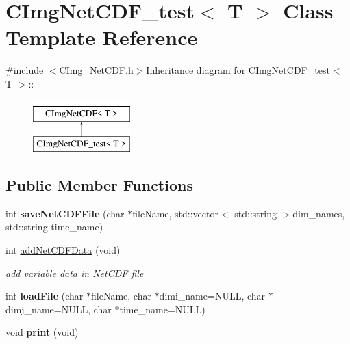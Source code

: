 \hypertarget{classCImgNetCDF__test}{
\section{CImgNetCDF\_\-test$<$ T $>$ Class Template Reference}
\label{classCImgNetCDF__test}
}


{\ttfamily \#include $<$CImg\_\-NetCDF.h$>$}Inheritance diagram for CImgNetCDF\_\-test$<$ T $>$::\begin{figure}[H]
\begin{center}
\leavevmode
\includegraphics[height=2cm]{classCImgNetCDF__test}
\end{center}
\end{figure}
\subsection*{Public Member Functions}
\begin{DoxyCompactItemize}
\item 
\hypertarget{classCImgNetCDF__test_a8700c63eb0460ff2335a99d85420d579}{
int {\bfseries saveNetCDFFile} (char $\ast$fileName, std::vector$<$ std::string $>$dim\_\-names, std::string time\_\-name)}
\label{classCImgNetCDF__test_a8700c63eb0460ff2335a99d85420d579}

\item 
int \hyperlink{classCImgNetCDF__test_aae308b73b10ea3a900000888c571754c}{addNetCDFData} (void)
\begin{DoxyCompactList}\small\item\em add variable data in NetCDF file \item\end{DoxyCompactList}\item 
\hypertarget{classCImgNetCDF__test_ac942fc1b5c2231ebedcc659bacfabe3b}{
int {\bfseries loadFile} (char $\ast$fileName, char $\ast$dimi\_\-name=NULL, char $\ast$dimj\_\-name=NULL, char $\ast$time\_\-name=NULL)}
\label{classCImgNetCDF__test_ac942fc1b5c2231ebedcc659bacfabe3b}

\item 
\hypertarget{classCImgNetCDF__test_abf052fbb1d30f9e35f7d6c5168011a3f}{
void {\bfseries print} (void)}
\label{classCImgNetCDF__test_abf052fbb1d30f9e35f7d6c5168011a3f}

\end{DoxyCompactItemize}


